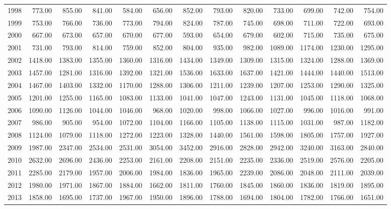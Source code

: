 \begin{longtable}{rrrrrrrrrrrrr}
  1998 & 773.00 & 855.00 & 841.00 & 584.00 & 656.00 & 852.00 & 793.00 & 820.00 & 733.00 & 699.00 & 742.00 & 754.00 \\ 
  1999 & 753.00 & 766.00 & 736.00 & 773.00 & 794.00 & 824.00 & 787.00 & 745.00 & 698.00 & 711.00 & 722.00 & 693.00 \\ 
  2000 & 667.00 & 673.00 & 657.00 & 670.00 & 677.00 & 593.00 & 654.00 & 679.00 & 602.00 & 715.00 & 735.00 & 675.00 \\ 
  2001 & 731.00 & 793.00 & 814.00 & 759.00 & 852.00 & 804.00 & 935.00 & 982.00 & 1089.00 & 1174.00 & 1230.00 & 1295.00 \\ 
  2002 & 1418.00 & 1383.00 & 1355.00 & 1360.00 & 1316.00 & 1434.00 & 1349.00 & 1309.00 & 1315.00 & 1324.00 & 1288.00 & 1369.00 \\ 
  2003 & 1457.00 & 1281.00 & 1316.00 & 1392.00 & 1321.00 & 1536.00 & 1633.00 & 1637.00 & 1421.00 & 1444.00 & 1440.00 & 1513.00 \\ 
  2004 & 1467.00 & 1403.00 & 1332.00 & 1170.00 & 1288.00 & 1306.00 & 1211.00 & 1239.00 & 1207.00 & 1253.00 & 1290.00 & 1325.00 \\ 
  2005 & 1201.00 & 1255.00 & 1165.00 & 1083.00 & 1133.00 & 1041.00 & 1047.00 & 1243.00 & 1131.00 & 1045.00 & 1118.00 & 1068.00 \\ 
  2006 & 1090.00 & 1126.00 & 1044.00 & 1046.00 & 968.00 & 1020.00 & 998.00 & 1066.00 & 1027.00 & 996.00 & 1016.00 & 991.00 \\ 
  2007 & 986.00 & 905.00 & 954.00 & 1072.00 & 1104.00 & 1166.00 & 1105.00 & 1138.00 & 1115.00 & 1031.00 & 987.00 & 1182.00 \\ 
  2008 & 1124.00 & 1079.00 & 1118.00 & 1272.00 & 1223.00 & 1328.00 & 1440.00 & 1561.00 & 1598.00 & 1805.00 & 1757.00 & 1927.00 \\ 
  2009 & 1987.00 & 2347.00 & 2534.00 & 2531.00 & 3054.00 & 3452.00 & 2916.00 & 2828.00 & 2942.00 & 3240.00 & 3163.00 & 2840.00 \\ 
  2010 & 2632.00 & 2696.00 & 2436.00 & 2253.00 & 2161.00 & 2208.00 & 2151.00 & 2235.00 & 2336.00 & 2519.00 & 2576.00 & 2205.00 \\ 
  2011 & 2285.00 & 2179.00 & 1957.00 & 2006.00 & 1984.00 & 1836.00 & 1965.00 & 2239.00 & 2086.00 & 2048.00 & 2111.00 & 2039.00 \\ 
  2012 & 1980.00 & 1971.00 & 1867.00 & 1884.00 & 1662.00 & 1811.00 & 1760.00 & 1845.00 & 1860.00 & 1836.00 & 1819.00 & 1895.00 \\ 
  2013 & 1858.00 & 1695.00 & 1737.00 & 1967.00 & 1950.00 & 1896.00 & 1788.00 & 1694.00 & 1804.00 & 1782.00 & 1766.00 & 1651.00 \\ 

\end{longtable}

